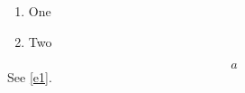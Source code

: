 \documentclass{article}
\begin{document}
\begin{enumerate}\item\label{i1} One \item Two\end{enumerate}
\begin{equation}a\label{e1}\end{equation}
See \cref{e1}.
\end{document}
